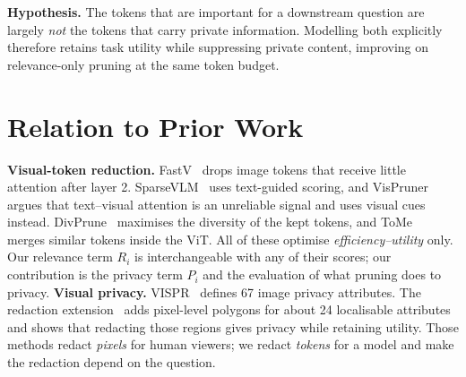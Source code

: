 \documentclass[10pt]{article}
\newcommand{\R}{R}
\renewcommand{\Pr}{P}
\begin{document}
\textbf{Hypothesis.} The tokens that are important for a downstream question are largely \emph{not} the tokens that carry private
information. Modelling both explicitly therefore retains task utility while suppressing private content, improving on
relevance-only pruning at the same token budget.

\section{Relation to Prior Work}
\textbf{Visual-token reduction.} FastV~\cite{chen2024fastv} drops image tokens that receive little attention after layer 2.
SparseVLM~\cite{zhang2025sparsevlm} uses text-guided scoring, and VisPruner~\cite{zhang2025vispruner} argues that text--visual attention
is an unreliable signal and uses visual cues instead. DivPrune~\cite{alvar2025divprune} maximises the diversity of the kept tokens,
and ToMe~\cite{bolya2023tome} merges similar tokens inside the ViT. All of these optimise \emph{efficiency--utility} only.
Our relevance term $\R_i$ is interchangeable with any of their scores; our contribution is the privacy term $\Pr_i$ and the
evaluation of what pruning does to privacy.
\textbf{Visual privacy.} VISPR~\cite{orekondy2017vispr} defines 67 image privacy attributes. The redaction extension~\cite{orekondy2018redactions}
adds pixel-level polygons for about 24 localisable attributes and shows that redacting those regions gives privacy while retaining utility.
Those methods redact \emph{pixels} for human viewers; we redact \emph{tokens} for a model and make the redaction depend on the question.
\end{document}

